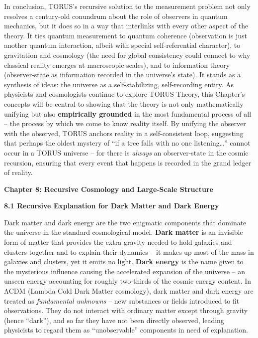 \documentclass[
]{article}
\begin{document}
In conclusion, TORUS's recursive solution to the measurement problem not
only resolves a century-old conundrum about the role of observers in
quantum mechanics, but it does so in a way that interlinks with every
other aspect of the theory. It ties quantum measurement to quantum
coherence (observation is just another quantum interaction, albeit with
special self-referential character), to gravitation and cosmology (the
need for global consistency could connect to why classical reality
emerges at macroscopic scales), and to information theory
(observer-state as information recorded in the universe's state). It
stands as a synthesis of ideas: the universe as a self-stabilizing,
self-recording entity. As physicists and cosmologists continue to
explore TORUS Theory, this Chapter's concepts will be central to showing
that the theory is not only mathematically unifying but also
\textbf{empirically grounded} in the most fundamental process of all --
the process by which we come to know reality itself. By unifying the
observer with the observed, TORUS anchors reality in a self-consistent
loop, suggesting that perhaps the oldest mystery of ``if a tree falls
with no one listening\ldots'' cannot occur in a TORUS universe -- for
there is \emph{always} an observer-state in the cosmic recursion,
ensuring that every event that happens is recorded in the grand ledger
of reality.

\textbf{Chapter 8: Recursive Cosmology and Large-Scale Structure}

\textbf{8.1 Recursive Explanation for Dark Matter and Dark Energy}

Dark matter and dark energy are the two enigmatic components that
dominate the universe in the standard cosmological model. \textbf{Dark
matter} is an invisible form of matter that provides the extra gravity
needed to hold galaxies and clusters together and to explain their
dynamics -- it makes up most of the mass in galaxies and clusters, yet
it emits no light\hspace{0pt}. \textbf{Dark energy} is the name given to
the mysterious influence causing the accelerated expansion of the
universe -- an unseen energy accounting for roughly two-thirds of the
cosmic energy content. In ΛCDM (Lambda Cold Dark Matter cosmology), dark
matter and dark energy are treated as \emph{fundamental unknowns} -- new
substances or fields introduced to fit observations. They do not
interact with ordinary matter except through gravity (hence ``dark''),
and so far they have not been directly observed, leading physicists to
regard them as ``unobservable'' components in need of explanation.
\end{document}
